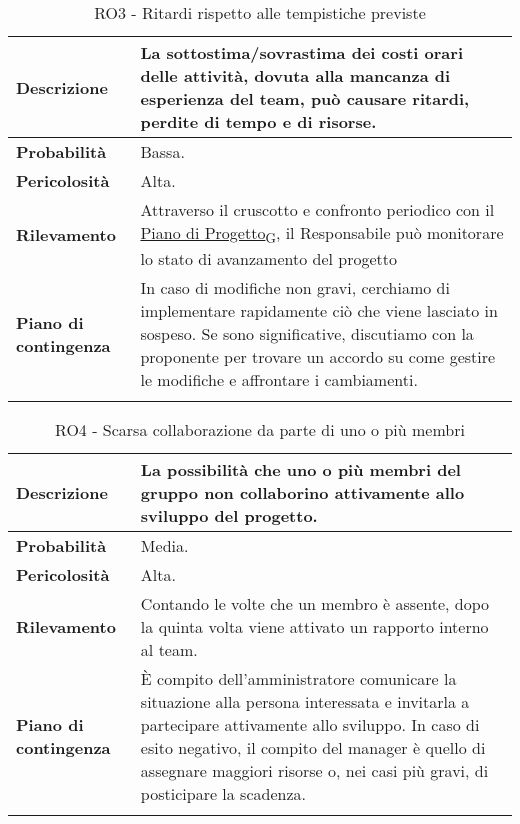 \begin{longtable}{ | l | p{10cm} | }
    \hline
    \textbf{Descrizione} & La sottostima/sovrastima dei costi orari delle attività, dovuta alla mancanza di esperienza del team, può causare ritardi, perdite di tempo e di risorse. \\
    \hline
    \textbf{Probabilità} & Bassa. \\
    \hline
    \textbf{Pericolosità} & Alta. \\
    \hline
    \textbf{Rilevamento} & Attraverso il cruscotto e confronto periodico con il \href{https://7last.github.io/docs/rtb/documentazione-interna/glossario#piano-di-progetto}{Piano di Progetto\textsubscript{G}}, il Responsabile può monitorare lo stato di avanzamento del progetto \\
    \hline
    \textbf{Piano di contingenza} & In caso di modifiche non gravi, cerchiamo di implementare rapidamente ciò che viene lasciato in sospeso. Se sono significative, discutiamo con la proponente per trovare un accordo su come gestire le modifiche e affrontare i cambiamenti.\\
    \hline
    \caption{RO3 - Ritardi rispetto alle tempistiche previste}
    \label{table:3}
\end{longtable}

\begin{longtable}{ | l | p{10cm} | }
    \hline
    \textbf{Descrizione} & La possibilità che uno o più membri del gruppo non collaborino attivamente allo sviluppo del progetto. \\
    \hline
    \textbf{Probabilità} & Media. \\
    \hline
    \textbf{Pericolosità} & Alta. \\
    \hline
    \textbf{Rilevamento} & Contando le volte che un membro è assente, dopo la quinta volta viene attivato un rapporto interno al team.\\
    \hline
    \textbf{Piano di contingenza} & È compito dell'amministratore comunicare la situazione alla persona interessata e invitarla a partecipare attivamente allo sviluppo. In caso di esito negativo, il compito del manager è quello di assegnare maggiori risorse o, nei casi più gravi, di posticipare la scadenza.\\
    \hline
    \caption{RO4 - Scarsa collaborazione da parte di uno o più membri}
    \label{table:4}
\end{longtable}


